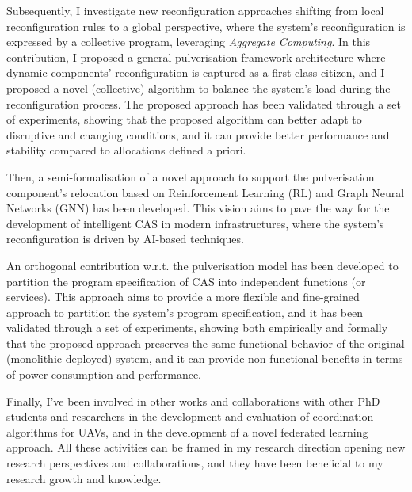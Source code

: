 \documentclass[runningheads]{llncs}
\begin{document}
Subsequently,
I investigate new reconfiguration approaches shifting from local reconfiguration rules to a global perspective,
where the system's reconfiguration is expressed by a collective program,
leveraging \emph{Aggregate Computing}.
%
In this contribution,
I proposed a general pulverisation framework architecture where dynamic components' reconfiguration is captured as a first-class citizen,
and I proposed a novel (collective) algorithm to balance the system's load during the reconfiguration process.
%
The proposed approach has been validated through a set of experiments,
showing that the proposed algorithm can better adapt to disruptive and changing conditions,
and it can provide better performance and stability compared to allocations defined a priori.

Then,
a semi-formalisation of a novel approach to support the pulverisation component's relocation based on Reinforcement Learning (RL) and Graph Neural Networks (GNN) has been developed.
%
This vision aims to pave the way for the development of intelligent CAS in modern infrastructures,
where the system's reconfiguration is driven by AI-based techniques.

An orthogonal contribution w.r.t. the pulverisation model has been developed to partition the program specification of CAS into independent functions (or services).
%
This approach aims to provide a more flexible and fine-grained approach to partition the system's program specification,
and it has been validated through a set of experiments,
showing both empirically and formally that the proposed approach preserves the same functional behavior of the original (monolithic deployed) system,
and it can provide non-functional benefits in terms of power consumption and performance.

Finally,
I've been involved in other works and collaborations with other PhD students and researchers
in the development and evaluation of coordination algorithms for UAVs,
and in the development of a novel federated learning approach.
%
All these activities can be framed in my research direction opening new research perspectives and collaborations,
and they have been beneficial to my research growth and knowledge.


\end{document}
